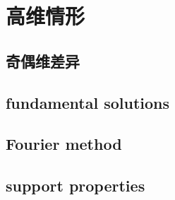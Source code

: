 \section{高维情形}
\label{b2:sec:1103}


\subsection{奇偶维差异}
\label{b2:subsec:110301}

\subsection{fundamental solutions}
\label{b2:subsec:110302}

\subsection{Fourier method}
\label{b2:subsec:110303}

\subsection{support properties}
\label{b2:subsec:110304}


